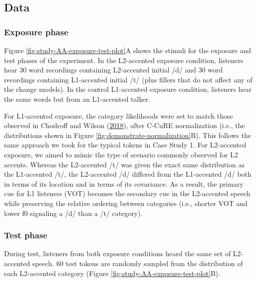 \documentclass[
  11pt,
  man,floatsintext]{apa6}
\begin{document}
\hypertarget{data-1}{%
\subsection{Data}\label{data-1}}

\hypertarget{exposure-phase-1}{%
\subsubsection{Exposure phase}\label{exposure-phase-1}}

Figure \ref{fig:study-AA-exposure-test-plot}A shows the stimuli for the exposure and test phases of the experiment. In the L2-accented exposure condition, listeners hear 30 word recordings containing L2-accented initial /d/ and 30 word recordings containing L1-accented initial /t/ (plus fillers that do not affect any of the change models). In the control L1-accented exposure condition, listeners hear the same words but from an L1-accented talker.

For L1-accented exposure, the category likelihoods were set to match those observed in Chodroff and Wilson (\protect\hyperlink{ref-chodroff-wilson2018}{2018}), after C-CuRE normalization (i.e., the distributions shown in Figure \ref{fig:demonstrate-normalization}B). This follows the same approach we took for the typical tokens in Case Study 1. For L2-accented exposure, we aimed to mimic the type of scenario commonly observed for L2 accents. Whereas the L2-accented /t/ was given the exact same distribution as the L1-accented /t/, the L2-accented /d/ differed from the L1-accented /d/ both in terms of its location and in terms of its covariance. As a result, the primary cue for L1 listeners (VOT) becomes the secondary cue in the L2-accented speech while preserving the relative ordering between categories (i.e., shorter VOT and lower f0 signaling a /d/ than a /t/ category).

\hypertarget{test-phase-1}{%
\subsubsection{Test phase}\label{test-phase-1}}

During test, listeners from both exposure conditions heard the same set of L2-accented speech. 60 test tokens are randomly sampled from the distribution of each L2-accented category (Figure \ref{fig:study-AA-exposure-test-plot}B).
\end{document}
